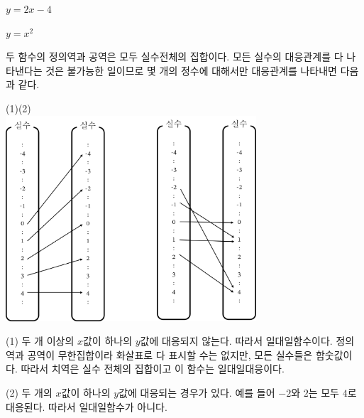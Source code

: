 \documentclass{oblivoir}
\begin{document}
\newpage
%
\begin{enumerate*}[itemjoin={\tabto{0.5\textwidth}}]\label{various4}
\item
\(y=2x-4\)
\item
\(y=x^2\)
\end{enumerate*}
\begin{mdframed}[frametitle=방법1]
두 함수의 정의역과 공역은 모두 실수전체의 집합이다.
모든 실수의 대응관계를 다 나타낸다는 것은 불가능한 일이므로 몇 개의 정수에 대해서만 대응관계를 나타내면 다음과 같다.
\begin{center}
(1)\hspace{120pt}(2)\\
\includegraphics[width=0.7\textwidth]{various_4-1}
\end{center}

(1) 두 개 이상의 \(x\)값이 하나의 \(y\)값에 대응되지 않는다.
따라서 일대일함수이다.\footnotemark[1]
정의역과 공역이 무한집합이라 화살표로 다 표시할 수는 없지만, 모든 실수들은 함숫값이다.
따라서 치역은 실수 전체의 집합이고 이 함수는 일대일대응이다.

(2) 두 개의 \(x\)값이 하나의 \(y\)값에 대응되는 경우가 있다.
예를 들어 \(-2\)와 \(2\)는 모두 \(4\)로 대응된다.
따라서 일대일함수가 아니다.\footnotemark[2]
\end{mdframed}
\end{document}
